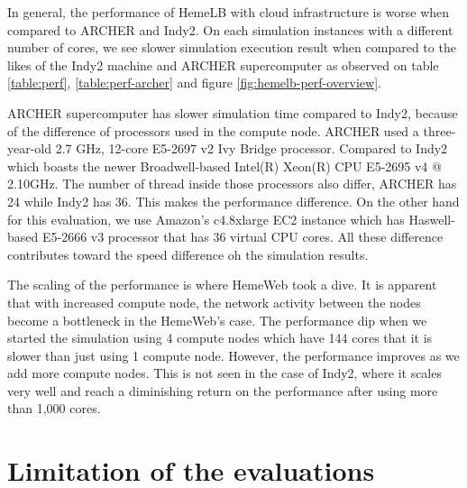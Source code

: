 \vspace{1cm}


In general, the performance of HemeLB with cloud infrastructure is worse when compared to ARCHER and Indy2. On each simulation instances with a different number of cores, we see slower simulation execution result when compared to the likes of the Indy2 machine and ARCHER supercomputer as observed on table \ref{table:perf}, \ref{table:perf-archer} and figure \ref{fig:hemelb-perf-overview}.

ARCHER supercomputer has slower simulation time compared to Indy2, because of the difference of processors used in the compute node. ARCHER used a three-year-old 2.7 GHz, 12-core E5-2697 v2 Ivy Bridge processor. Compared to Indy2 which boasts the newer Broadwell-based Intel(R) Xeon(R) CPU E5-2695 v4 @ 2.10GHz. The number of thread inside those processors also differ, ARCHER has 24 while Indy2 has 36. This makes the performance difference. On the other hand for this evaluation, we use Amazon's c4.8xlarge EC2 instance which has Haswell-based E5-2666 v3 processor that has 36 virtual CPU cores. All these difference contributes toward the speed difference oh the simulation results.

The scaling of the performance is where HemeWeb took a dive. It is apparent that with increased compute node, the network activity between the nodes become a bottleneck in the HemeWeb's case. The performance dip when we started the simulation using 4 compute nodes which have 144 cores that it is slower than just using 1 compute node. However, the performance improves as we add more compute nodes. This is not seen in the case of Indy2, where it scales very well and reach a diminishing return on the performance after using more than 1,000 cores.




\section {Limitation of the evaluations}

